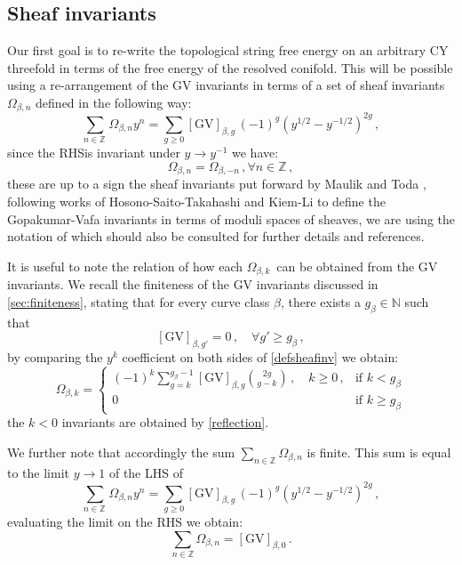 \documentclass[a4paper,12pt,justification=centering]{article}
\numberwithin{equation}{section}
\theoremstyle{plain}%
\theoremstyle{definition}
\begin{document}
\subsection{Sheaf invariants}\label{subsec:sheafinv}
Our first goal is to re-write the topological string free energy on an arbitrary CY threefold in terms of the free energy of the resolved conifold. This will be possible using a re-arrangement of the GV invariants in terms of a set of sheaf invariants $\Omega_{\beta,n}$  defined in the following way:
\begin{equation}\label{defsheafinv}
\sum_{n\in \mathbb{Z}\,} \Omega_{\beta,n} y^n = \sum_{g\ge0} [\textrm{GV}]_{\beta,g}\, (-1)^g (y^{1/2}-y^{-1/2})^{2g}\,,
\end{equation}
since the RHSis invariant under $y\rightarrow y^{-1}$ we have:
\begin{equation}\label{reflection}
\Omega_{\beta,n}=\Omega_{\beta,-n}\,, \forall n \in \mathbb{Z}\,,
\end{equation}
these are up to a sign the sheaf invariants put forward by Maulik and Toda \cite{MaulikToda}, following works of Hosono-Saito-Takahashi \cite{HST} and Kiem-Li \cite{KiemLi} to define the Gopakumar-Vafa invariants in terms of moduli spaces of sheaves, we are using the notation of \cite{Stoppa} which should also be consulted for further details and references.

It is useful to note the relation of how each $\Omega_{\beta,k}\, $ can be obtained from the GV invariants. We recall the finiteness of the GV invariants discussed in \ref{sec:finiteness}, stating that for every curve class $\beta$, there exists a $g_{\beta}\in \mathbb{N}$ such that 
$$[\textrm{GV}]_{\beta,g'}=0 \,, \quad \forall g'\ge g_{\beta}\,,$$
by comparing the $y^k$ coefficient on both sides of \eqref{defsheafinv} we obtain:
\begin{equation}
\Omega_{\beta,k}=  \left\{
	\begin{array}{ll}
		(-1)^k \sum_{g=k}^{g_{\beta}-1}   [\textrm{GV}]_{\beta,g} \binom{2g}{g-k} \,, \quad k\ge 0\,,   & \mbox{if } k < g_{\beta} \\
		0 & \mbox{if }  k \ge g_{\beta}
	\end{array}
\right.\end{equation}
the $k<0$ invariants are obtained by \eqref{reflection}. 

We further note that accordingly the sum $\sum_{n\in\mathbb{Z}}\Omega_{\beta,n}$ is finite. This sum is equal to the limit $y\rightarrow 1$ of the LHS of
\begin{equation*}
\sum_{n\in \mathbb{Z}\,} \Omega_{\beta,n} y^n = \sum_{g\ge0} [\textrm{GV}]_{\beta,g}\, (-1)^g (y^{1/2}-y^{-1/2})^{2g}\,,
\end{equation*}
evaluating the limit on the RHS we obtain:
\begin{equation}\label{eq:sumOmega}
\sum_{n\in \mathbb{Z}} \Omega_{\beta,n}  = [\textrm{GV}]_{\beta,0}\,.
\end{equation}
\end{document}
